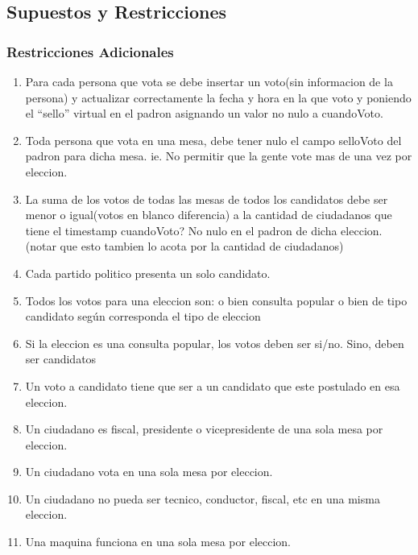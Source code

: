 \subsection{Supuestos y Restricciones}

\subsubsection{Restricciones Adicionales}

\begin{enumerate}
	\item  Para cada persona que vota se debe insertar un voto(sin informacion de la persona) y actualizar correctamente la fecha y hora en la que voto y poniendo el “sello” virtual en el padron asignando un valor no nulo a cuandoVoto.
	\item Toda persona que vota en una mesa, debe tener nulo el campo selloVoto del padron para dicha mesa. ie. No permitir que la gente vote mas de una vez por eleccion.
	\item  La suma de los votos de todas las mesas de todos los candidatos debe ser menor o igual(votos en blanco diferencia) a la cantidad de ciudadanos que tiene el timestamp cuandoVoto? No nulo en el padron de dicha eleccion. (notar que esto tambien lo acota por la cantidad de ciudadanos)
	\item  Cada partido politico presenta un solo candidato.
	\item  Todos los votos para una eleccion son: o bien consulta popular o bien de tipo candidato según corresponda el tipo de eleccion
	\item Si la eleccion es una consulta popular, los votos deben ser si/no. Sino, deben ser candidatos
	\item Un voto a candidato tiene que ser a un candidato que este postulado en esa eleccion.
	\item Un ciudadano es fiscal, presidente o vicepresidente de una sola mesa por eleccion.
	\item Un ciudadano vota en una sola mesa por eleccion.
	\item Un ciudadano no pueda ser tecnico, conductor, fiscal, etc en una misma eleccion.
	\item Una maquina funciona en una sola mesa por eleccion.
\end{enumerate}
